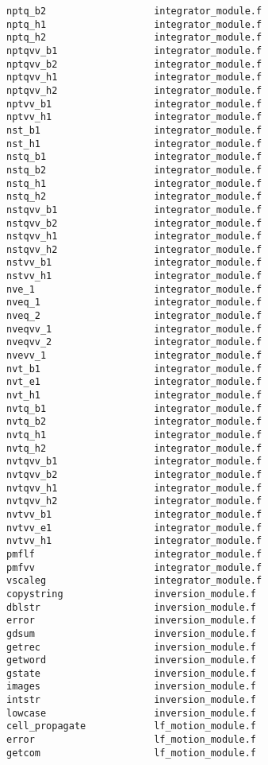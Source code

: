 \begin{verbatim}
nptq_b2                   integrator_module.f
nptq_h1                   integrator_module.f
nptq_h2                   integrator_module.f
nptqvv_b1                 integrator_module.f
nptqvv_b2                 integrator_module.f
nptqvv_h1                 integrator_module.f
nptqvv_h2                 integrator_module.f
nptvv_b1                  integrator_module.f
nptvv_h1                  integrator_module.f
nst_b1                    integrator_module.f
nst_h1                    integrator_module.f
nstq_b1                   integrator_module.f
nstq_b2                   integrator_module.f
nstq_h1                   integrator_module.f
nstq_h2                   integrator_module.f
nstqvv_b1                 integrator_module.f
nstqvv_b2                 integrator_module.f
nstqvv_h1                 integrator_module.f
nstqvv_h2                 integrator_module.f
nstvv_b1                  integrator_module.f
nstvv_h1                  integrator_module.f
nve_1                     integrator_module.f
nveq_1                    integrator_module.f
nveq_2                    integrator_module.f
nveqvv_1                  integrator_module.f
nveqvv_2                  integrator_module.f
nvevv_1                   integrator_module.f
nvt_b1                    integrator_module.f
nvt_e1                    integrator_module.f
nvt_h1                    integrator_module.f
nvtq_b1                   integrator_module.f
nvtq_b2                   integrator_module.f
nvtq_h1                   integrator_module.f
nvtq_h2                   integrator_module.f
nvtqvv_b1                 integrator_module.f
nvtqvv_b2                 integrator_module.f
nvtqvv_h1                 integrator_module.f
nvtqvv_h2                 integrator_module.f
nvtvv_b1                  integrator_module.f
nvtvv_e1                  integrator_module.f
nvtvv_h1                  integrator_module.f
pmflf                     integrator_module.f
pmfvv                     integrator_module.f
vscaleg                   integrator_module.f
copystring                inversion_module.f
dblstr                    inversion_module.f
error                     inversion_module.f
gdsum                     inversion_module.f
getrec                    inversion_module.f
getword                   inversion_module.f
gstate                    inversion_module.f
images                    inversion_module.f
intstr                    inversion_module.f
lowcase                   inversion_module.f
cell_propagate            lf_motion_module.f
error                     lf_motion_module.f
getcom                    lf_motion_module.f

\end{verbatim}
